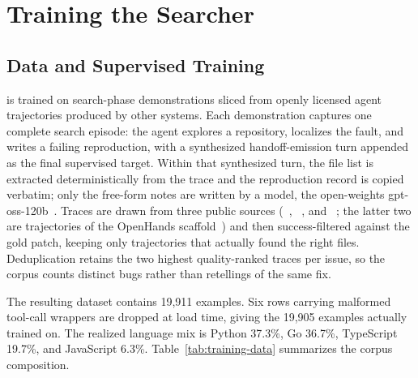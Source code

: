 \section{Training the Searcher}
\label{sec:training}

\subsection{Data and Supervised Training}
\label{sec:training-data}

\modelname is trained on search-phase demonstrations sliced from openly licensed
agent trajectories produced by other systems. Each demonstration captures one
complete search episode: the agent explores a repository, localizes the fault,
and writes a failing reproduction, with a synthesized handoff-emission turn
appended as the final supervised target. Within that synthesized turn, the
file list is extracted deterministically from the trace and the reproduction
record is copied verbatim; only the free-form notes are written by a model,
the open-weights gpt-oss-120b~\citep{gptoss}. Traces are drawn from three public
sources (~\citep{openswetraces},
~\citep{nebiusrebench,swerebench}, and
~\citep{swehero}; the latter two are trajectories of
the OpenHands scaffold~\citep{openhands}) and then success-filtered
against the gold patch, keeping only trajectories that actually found the right files.
Deduplication retains the two highest quality-ranked traces per issue, so the
corpus counts distinct bugs rather than retellings of the same fix.

The resulting dataset contains 19{,}911 examples. Six rows carrying malformed
tool-call wrappers are dropped at load time, giving the 19{,}905 examples
actually trained on. The realized language mix is Python 37.3\%, Go 36.7\%,
TypeScript 19.7\%, and JavaScript 6.3\%.
Table~\ref{tab:training-data} summarizes the corpus composition.

\begin{table}[!tbp]
\centering
\caption{\textbf{Composition of \modelname's supervised search corpus.}
Each example is a full search trajectory with a synthesized
handoff-emission turn as the final supervised step; loss is on assistant
turns only.  Traces are success-filtered and deduplicated to two per
issue.  The 23 evaluation repositories and 450 held-out vault issues are
excluded; both exclusions were verified by a programmatic gate.}
\label{tab:training-data}

\end{table}

